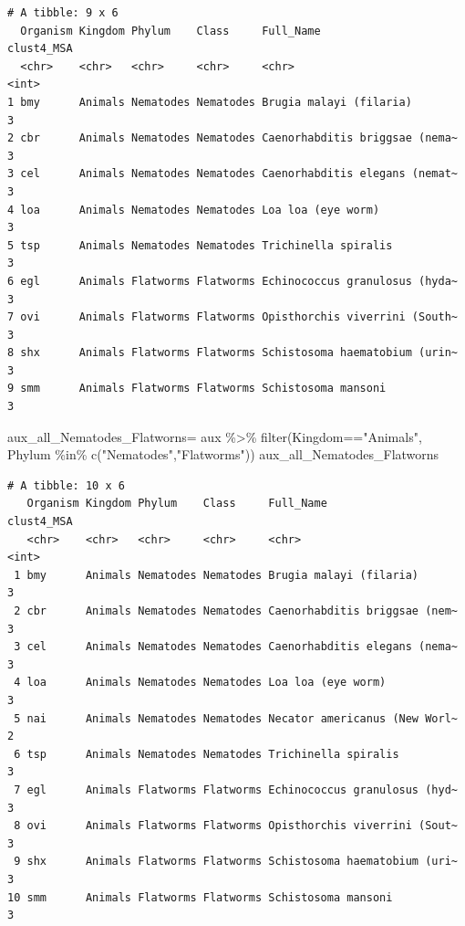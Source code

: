 \documentclass[
  letterpaper,
  DIV=11,
  numbers=noendperiod]{scrreprt}
\newenvironment{Shaded}{}{}
\newcommand{\FunctionTok}[1]{\textcolor[rgb]{0.38,0.69,0.94}{#1}}
\newcommand{\NormalTok}[1]{\textcolor[rgb]{0.67,0.70,0.75}{#1}}
\newcommand{\OtherTok}[1]{\textcolor[rgb]{0.15,0.68,0.38}{#1}}
\newcommand{\SpecialCharTok}[1]{\textcolor[rgb]{0.34,0.71,0.76}{#1}}
\newcommand{\StringTok}[1]{\textcolor[rgb]{0.60,0.76,0.47}{#1}}
\begin{document}
\begin{verbatim}
# A tibble: 9 x 6
  Organism Kingdom Phylum    Class     Full_Name                      clust4_MSA
  <chr>    <chr>   <chr>     <chr>     <chr>                               <int>
1 bmy      Animals Nematodes Nematodes Brugia malayi (filaria)                 3
2 cbr      Animals Nematodes Nematodes Caenorhabditis briggsae (nema~          3
3 cel      Animals Nematodes Nematodes Caenorhabditis elegans (nemat~          3
4 loa      Animals Nematodes Nematodes Loa loa (eye worm)                      3
5 tsp      Animals Nematodes Nematodes Trichinella spiralis                    3
6 egl      Animals Flatworms Flatworms Echinococcus granulosus (hyda~          3
7 ovi      Animals Flatworms Flatworms Opisthorchis viverrini (South~          3
8 shx      Animals Flatworms Flatworms Schistosoma haematobium (urin~          3
9 smm      Animals Flatworms Flatworms Schistosoma mansoni                     3
\end{verbatim}

\begin{Shaded}
\begin{Highlighting}[]
\NormalTok{aux\_all\_Nematodes\_Flatworns}\OtherTok{=}\NormalTok{ aux }\SpecialCharTok{\%\textgreater{}\%} 
  \FunctionTok{filter}\NormalTok{(Kingdom}\SpecialCharTok{==}\StringTok{"Animals"}\NormalTok{,}
\NormalTok{         Phylum }\SpecialCharTok{\%in\%} \FunctionTok{c}\NormalTok{(}\StringTok{"Nematodes"}\NormalTok{,}\StringTok{"Flatworms"}\NormalTok{))}
\NormalTok{aux\_all\_Nematodes\_Flatworns}
\end{Highlighting}
\end{Shaded}

\begin{verbatim}
# A tibble: 10 x 6
   Organism Kingdom Phylum    Class     Full_Name                     clust4_MSA
   <chr>    <chr>   <chr>     <chr>     <chr>                              <int>
 1 bmy      Animals Nematodes Nematodes Brugia malayi (filaria)                3
 2 cbr      Animals Nematodes Nematodes Caenorhabditis briggsae (nem~          3
 3 cel      Animals Nematodes Nematodes Caenorhabditis elegans (nema~          3
 4 loa      Animals Nematodes Nematodes Loa loa (eye worm)                     3
 5 nai      Animals Nematodes Nematodes Necator americanus (New Worl~          2
 6 tsp      Animals Nematodes Nematodes Trichinella spiralis                   3
 7 egl      Animals Flatworms Flatworms Echinococcus granulosus (hyd~          3
 8 ovi      Animals Flatworms Flatworms Opisthorchis viverrini (Sout~          3
 9 shx      Animals Flatworms Flatworms Schistosoma haematobium (uri~          3
10 smm      Animals Flatworms Flatworms Schistosoma mansoni                    3
\end{verbatim}
\end{document}
